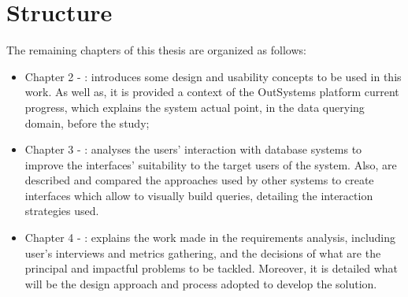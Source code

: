 \section{Structure}
\label{sec:structure}

The remaining chapters of this thesis are organized as follows:

\begin{itemize}
  \item Chapter 2 - : introduces some design and usability concepts to be used in this work. As well as,  it is provided a context of the OutSystems platform current progress, which explains the system actual point, in the data querying domain, before the study;
  \item Chapter 3 - : analyses the users' interaction with database systems to improve the interfaces' suitability to the target users of the system. Also, are described and compared the approaches used by other systems to create interfaces which allow to visually build queries, detailing the interaction strategies used.
  \item Chapter 4 - : explains the work made in the requirements analysis, including user's interviews and metrics gathering, and the decisions of what are the principal and impactful problems to be tackled. Moreover, it is detailed what will be the design approach and process adopted to develop the solution.
\end{itemize}
